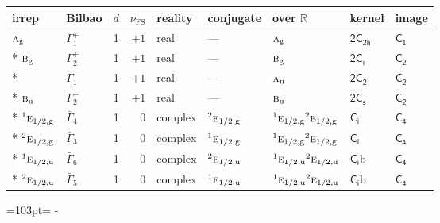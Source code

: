 \documentclass[10pt,a4paper]{article}
\makeatletter
\def\grouprule#1#2{\noalign{\marks\LTgroupmarks{\the\belowrulesep}\nobreak\vskip#1%
  \vskip\aboverulesep}\multispan\LT@cols\unskip{\leaders\hrule\@height#2\hfill\kern\z@}\cr
  \noalign{\penalty\LTrulebreak\vskip\belowrulesep\global\@lastruleclass\z@}}
\newcommand{\needspace}[1]{\par\penalty-100\begingroup\dimen0=#1\relax\dimen2=\pagegoal
  \advance\dimen2-\pagetotal\ifdim\dimen0>\dimen2\relax\ifdim\dimen2>0pt\vfil\break\fi\fi
  \endgroup}
\numberwithin{equation}{section}
\newcommand{\grp}[1]{\mathsf{#1}}
\newcommand{\irr}[1]{\text{\normalfont\scshape #1}}
\newcommand{\conjpair}[1]{{}^{#1}}
\newcommand{\detbox}[1]{{\setlength{\fboxsep}{1pt}\fbox{#1}}}
\newcommand{\ptag}[1]{\mathrm{#1}}
\newcommand{\fsind}{\nu_{\mathrm{FS}}}
\newcommand{\secondclass}{\mathrm{b}}
\makeatother
\begin{document}
{\small\renewcommand{\arraystretch}{1.25}\setlength{\tabcolsep}{4pt}\begin{longtable}{@{}llrrlllll@{}}\toprule
irrep & Bilbao & $d$ & $\fsind$ & reality & conjugate & over $\mathbb{R}$ & kernel & image\\\midrule\endhead
\bottomrule\endfoot\endlastfoot
$\irr{a}_{\ptag{g}}$ & $\Gamma_{1}^{+}$ & 1 & $+1$ & real & --- & $\irr{a}_{\ptag{g}}$ & \href{2C2h.pdf}{$\grp{2C_{2h}}$} & \href{../../../rotation/data/pdf/C1.pdf}{$\grp{C_{1}}$}\\*
$\irr{b}_{\ptag{g}}$ & $\Gamma_{2}^{+}$ & 1 & $+1$ & real & --- & $\irr{b}_{\ptag{g}}$ & \href{2S2.pdf}{$\grp{2C_{i}}$} & \href{../../../rotation/data/pdf/C2.pdf}{$\grp{C_{2}}$}\\*
\detbox{$\irr{a}_{\ptag{u}}$} & $\Gamma_{1}^{-}$ & 1 & $+1$ & real & --- & $\irr{a}_{\ptag{u}}$ & \href{2C2.pdf}{$\grp{2C_{2}}$} & \href{../../../rotation/data/pdf/C2.pdf}{$\grp{C_{2}}$}\\*
$\irr{b}_{\ptag{u}}$ & $\Gamma_{2}^{-}$ & 1 & $+1$ & real & --- & $\irr{b}_{\ptag{u}}$ & \href{2C1v.pdf}{$\grp{2C_{s}}$} & \href{../../../rotation/data/pdf/C2.pdf}{$\grp{C_{2}}$}\\*
\grouprule{0pt}{\lightrulewidth}
$\conjpair{1}\irr{e}_{1/2,\ptag{g}}$ & $\bar{\Gamma}_{4}$ & 1 & $0$ & complex & $\conjpair{2}\irr{e}_{1/2,\ptag{g}}$ & $\conjpair{1}\irr{e}_{1/2,\ptag{g}}\conjpair{2}\irr{e}_{1/2,\ptag{g}}$ & \href{S2.pdf}{$\grp{C_{i}}$} & \href{../../../rotation/data/pdf/C4.pdf}{$\grp{C_{4}}$}\\*
$\conjpair{2}\irr{e}_{1/2,\ptag{g}}$ & $\bar{\Gamma}_{3}$ & 1 & $0$ & complex & $\conjpair{1}\irr{e}_{1/2,\ptag{g}}$ & $\conjpair{1}\irr{e}_{1/2,\ptag{g}}\conjpair{2}\irr{e}_{1/2,\ptag{g}}$ & \href{S2.pdf}{$\grp{C_{i}}$} & \href{../../../rotation/data/pdf/C4.pdf}{$\grp{C_{4}}$}\\*
$\conjpair{1}\irr{e}_{1/2,\ptag{u}}$ & $\bar{\Gamma}_{6}$ & 1 & $0$ & complex & $\conjpair{2}\irr{e}_{1/2,\ptag{u}}$ & $\conjpair{1}\irr{e}_{1/2,\ptag{u}}\conjpair{2}\irr{e}_{1/2,\ptag{u}}$ & \href{S2b.pdf}{$\grp{C_{i}}\secondclass$} & \href{../../../rotation/data/pdf/C4.pdf}{$\grp{C_{4}}$}\\*
$\conjpair{2}\irr{e}_{1/2,\ptag{u}}$ & $\bar{\Gamma}_{5}$ & 1 & $0$ & complex & $\conjpair{1}\irr{e}_{1/2,\ptag{u}}$ & $\conjpair{1}\irr{e}_{1/2,\ptag{u}}\conjpair{2}\irr{e}_{1/2,\ptag{u}}$ & \href{S2b.pdf}{$\grp{C_{i}}\secondclass$} & \href{../../../rotation/data/pdf/C4.pdf}{$\grp{C_{4}}$}\\
\bottomrule\end{longtable}}
\needspace{103pt}
\end{document}
